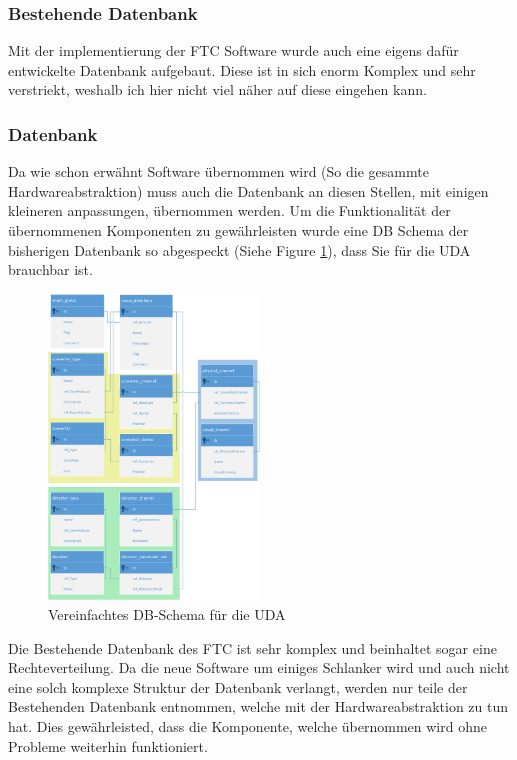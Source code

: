 \documentclass[10pt]{scrartcl}
\begin{document}
\subsubsection{Bestehende Datenbank}
Mit der implementierung der FTC Software wurde auch eine eigens dafür entwickelte Datenbank aufgebaut. Diese ist in sich enorm Komplex und sehr verstriekt, weshalb ich hier nicht viel näher auf diese eingehen kann.
\subsubsection{Datenbank}
Da wie schon erwähnt Software übernommen wird (So die gesammte Hardwareabstraktion) muss auch die Datenbank an diesen Stellen, mit einigen kleineren anpassungen, übernommen werden. Um die Funktionalität der übernommenen Komponenten zu gewährleisten wurde eine DB Schema der bisherigen Datenbank so abgespeckt (Siehe Figure \ref{fig:DBSchemaUDA}), dass Sie für die UDA brauchbar ist.
\begin{figure}[htbp] 
	\centering
	\includegraphics[width=0.5\textwidth]{DBSchemaUDA}
	\caption{Vereinfachtes DB-Schema für die UDA}
	\label{fig:DBSchemaUDA}
\end{figure}

Die Bestehende Datenbank des FTC ist sehr komplex und beinhaltet sogar eine Rechteverteilung. Da die neue Software um einiges Schlanker wird und auch nicht eine solch komplexe Struktur der Datenbank verlangt, werden nur teile der Bestehenden Datenbank entnommen, welche mit der Hardwareabstraktion zu tun hat. Dies gewährleisted, dass die Komponente, welche übernommen wird ohne Probleme weiterhin funktioniert. 
\end{document}
